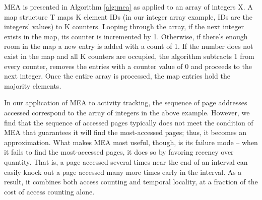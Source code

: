 
MEA is presented in Algorithm \ref{alg:mea} as applied to an array of integers X. A map structure T maps K element IDs (in our integer array example, IDs are the integers' values) to K counters. Looping through the array, if the next integer exists in the map, its counter is incremented by 1. Otherwise, if there's enough room in the map a new entry is added with a count of 1. If the number does not exist in the map and all K counters are occupied, the algorithm subtracts 1 from every counter, removes the entries with a counter value of 0 and proceeds to the next integer. Once the entire array is processed, the map entries hold the majority elements. 


In our application of MEA to activity tracking, the sequence of page addresses accessed correspond to the array of integers in the above example. 
However, we find that the sequence of accessed pages typically does not
meet the condition of MEA that guarantees it will find the most-accessed
pages; thus, it becomes an approximation.  What makes MEA most useful,
though, is its failure mode -- when it fails to find the most-accessed pages,
it does so by favoring recency over quantity.  That is, a page accessed several
times near the end of an interval can easily knock out a page accessed many
more times early in the interval.  As a result, it combines both access
counting and temporal locality, at a fraction of the cost of access counting
alone.

